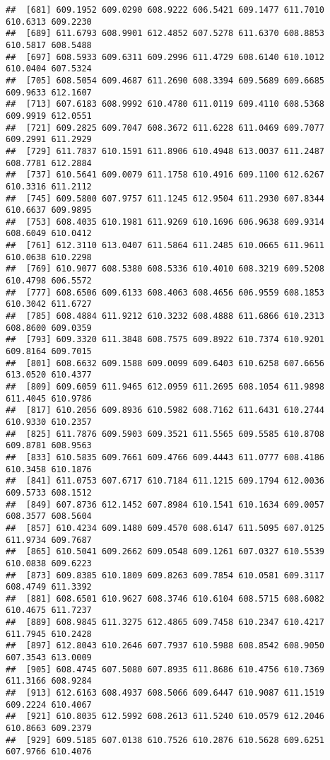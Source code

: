 \documentclass[
]{article}
\begin{document}
\begin{verbatim}
##  [681] 609.1952 609.0290 608.9222 606.5421 609.1477 611.7010 610.6313 609.2230
##  [689] 611.6793 608.9901 612.4852 607.5278 611.6370 608.8853 610.5817 608.5488
##  [697] 608.5933 609.6311 609.2996 611.4729 608.6140 610.1012 610.0404 607.5324
##  [705] 608.5054 609.4687 611.2690 608.3394 609.5689 609.6685 609.9633 612.1607
##  [713] 607.6183 608.9992 610.4780 611.0119 609.4110 608.5368 609.9919 612.0551
##  [721] 609.2825 609.7047 608.3672 611.6228 611.0469 609.7077 609.2991 611.2929
##  [729] 611.7837 610.1591 611.8906 610.4948 613.0037 611.2487 608.7781 612.2884
##  [737] 610.5641 609.0079 611.1758 610.4916 609.1100 612.6267 610.3316 611.2112
##  [745] 609.5800 607.9757 611.1245 612.9504 611.2930 607.8344 610.6637 609.9895
##  [753] 608.4035 610.1981 611.9269 610.1696 606.9638 609.9314 608.6049 610.0412
##  [761] 612.3110 613.0407 611.5864 611.2485 610.0665 611.9611 610.0638 610.2298
##  [769] 610.9077 608.5380 608.5336 610.4010 608.3219 609.5208 610.4798 606.5572
##  [777] 608.6506 609.6133 608.4063 608.4656 606.9559 608.1853 610.3042 611.6727
##  [785] 608.4884 611.9212 610.3232 608.4888 611.6866 610.2313 608.8600 609.0359
##  [793] 609.3320 611.3848 608.7575 609.8922 610.7374 610.9201 609.8164 609.7015
##  [801] 608.6632 609.1588 609.0099 609.6403 610.6258 607.6656 613.0520 610.4377
##  [809] 609.6059 611.9465 612.0959 611.2695 608.1054 611.9898 611.4045 610.9786
##  [817] 610.2056 609.8936 610.5982 608.7162 611.6431 610.2744 610.9330 610.2357
##  [825] 611.7876 609.5903 609.3521 611.5565 609.5585 610.8708 609.8781 608.9563
##  [833] 610.5835 609.7661 609.4766 609.4443 611.0777 608.4186 610.3458 610.1876
##  [841] 611.0753 607.6717 610.7184 611.1215 609.1794 612.0036 609.5733 608.1512
##  [849] 607.8736 612.1452 607.8984 610.1541 610.1634 609.0057 608.3577 608.5604
##  [857] 610.4234 609.1480 609.4570 608.6147 611.5095 607.0125 611.9734 609.7687
##  [865] 610.5041 609.2662 609.0548 609.1261 607.0327 610.5539 610.0838 609.6223
##  [873] 609.8385 610.1809 609.8263 609.7854 610.0581 609.3117 608.4749 611.3392
##  [881] 608.6501 610.9627 608.3746 610.6104 608.5715 608.6082 610.4675 611.7237
##  [889] 608.9845 611.3275 612.4865 609.7458 610.2347 610.4217 611.7945 610.2428
##  [897] 612.8043 610.2646 607.7937 610.5988 608.8542 608.9050 607.3543 613.0009
##  [905] 608.4745 607.5080 607.8935 611.8686 610.4756 610.7369 611.3166 608.9284
##  [913] 612.6163 608.4937 608.5066 609.6447 610.9087 611.1519 609.2224 610.4067
##  [921] 610.8035 612.5992 608.2613 611.5240 610.0579 612.2046 610.8663 609.2379
##  [929] 609.5185 607.0138 610.7526 610.2876 610.5628 609.6251 607.9766 610.4076

\end{verbatim}
\end{document}
